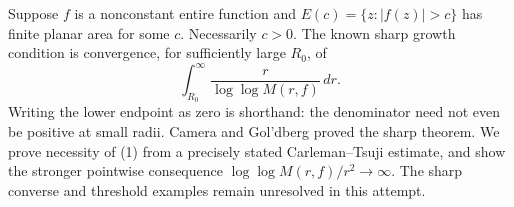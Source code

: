 Suppose $f$ is a nonconstant entire function and $E(c)=\{z:|f(z)|>c\}$ has finite planar area for some $c$. Necessarily $c>0$. The known sharp growth condition is convergence, for sufficiently large $R_0$, of
\[
 \int_{R_0}^{\infty}\frac{r}{\log\log M(r,f)}\,dr.
 \tag{1}
\]
Writing the lower endpoint as zero is shorthand: the denominator need not even be positive at small radii. Camera and Gol'dberg proved the sharp theorem. We prove necessity of (1) from a precisely stated Carleman--Tsuji estimate, and show the stronger pointwise consequence $\log\log M(r,f)/r^2\to\infty$. The sharp converse and threshold examples remain unresolved in this attempt.
